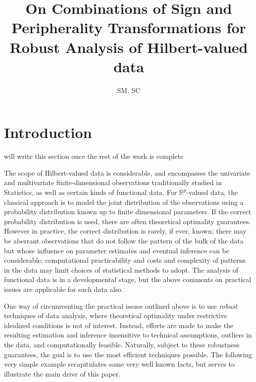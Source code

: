 \documentclass[12pt,letterpaper]{article}
\newcommand{\BR}{\mathbb{R}}
\def\bredbf#1\eredbf{{\color{red}{\bf ???? #1 ????}}}
\theoremstyle{Example}
\begin{document}




\makeatletter
\def\@oddfoot{[\jobname (\today)]\hfil\thepage}
\makeatother

\title{On Combinations of Sign and Peripherality Transformations for Robust Analysis
of Hilbert-valued data}

\author{SM, SC}

\maketitle

\section{Introduction}

\bredbf
I will write this section once the rest of the work is complete
\eredbf

The scope of Hilbert-valued data is considerable, and encompasses 
the univariate and multivariate finite-dimensional observations traditionally 
studied in Statistics, as well  as certain kinds of functional data. For 
$\BR^{p}$-valued data, the classical approach is to model the joint distribution 
of the observations using a probability distribution known up to finite dimensional
parameters. If the correct probability distribution is used, there are often 
theoretical optimality guarantees. However in practice, the correct distribution is 
rarely, if ever, known; there may be aberrant observations that do not follow the 
pattern of the bulk of the data but whose influence on parameter estimates and 
eventual inference can be considerable; computational practicability and costs 
and complexity of patterns in the data may limit choices of statistical methods 
to adopt. The analysis of functional data is in a developmental stage, 
but the above comments on practical issues are applicable for such data also.

One way of circumventing the practical issues outlined above is to use 
{\it robust} techniques of data analysis, where theoretical optimality under 
restrictive idealized conditions is not of interest. Instead, efforts are made to 
make the resulting estimation and inference insensitive to  technical assumptions, 
outliers in the data, and computationally feasible. Naturally, subject to these 
robustness guarantees, the goal is to use the most efficient techniques possible.
The following very simple example recapitulates some very well known facts, but 
serves to illustrate the main drive of this paper.
\end{document}
